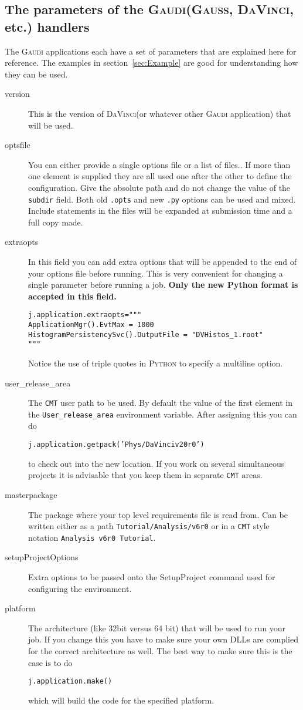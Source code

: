 \documentclass{howto}
\def\python {\textsc{Python}\xspace}
\def\gaudi {\textsc{Gaudi}\xspace}
\def\davinci {\textsc{DaVinci}\xspace}
\def\gauss {\textsc{Gauss}\xspace}
\def\davinciv {v20r0\xspace}
\begin{document}
\subsection{The parameters of the \gaudi (\gauss, \davinci, etc.) handlers}
\label{sec:GaudiParameters}
The \gaudi applications each have a set of parameters that are explained here
for reference. The examples in section~\ref{sec:Example} are good for
understanding how they can be used.
\begin{description}
\item[version] This is the version of \davinci (or whatever other \gaudi
  application) that will be used.
\item[optsfile] You can either provide a single options file or a list of
  files.. If more than one element is supplied they are all used one after the
  other to define the configuration. Give the absolute path and do not change
  the value of the \texttt{subdir} field. Both old \texttt{.opts} and new
  \texttt{.py} options can be used and mixed. Include statements in the files
  will be expanded at submission time and a full copy made.
\item[extraopts] In this field you can add extra options that will be appended
  to the end of your options file before running. This is very convenient for
  changing a single parameter before running a job. \textbf{Only the new
    Python format is accepted in this field.}
\begin{verbatim}
j.application.extraopts="""
ApplicationMgr().EvtMax = 1000
HistogramPersistencySvc().OutputFile = "DVHistos_1.root"
"""
\end{verbatim}
  Notice the use of triple quotes in \python to specify a multiline option.
\item[user_release_area] The \texttt{CMT} user path to be used. By default the
  value of the first element in the \texttt{User_release_area} environment
  variable. After assigning this you can do
\begin{alltt}
j.application.getpack('Phys/DaVinci \davinciv') 
\end{alltt}
  to check out into the new location. If you work on several simultaneous
  projects it is advisable that you keep them in separate \texttt{CMT} areas.
\item[masterpackage] The package where your top level requirements file is
  read from. Can be written either as a path \texttt{Tutorial/Analysis/v6r0}
  or in a \texttt{CMT} style notation \texttt{Analysis v6r0 Tutorial}.
\item[setupProjectOptions] Extra options to be passed onto the SetupProject command used for configuring the environment.
\item[platform] The architecture (like 32bit versus 64 bit) that will be used
  to run your job. If you change this you have to make sure your own DLLs are
  complied for the correct architecture as well. The best way to make sure
  this is the case is to do
\begin{verbatim}
j.application.make()
\end{verbatim}
  which will build the code for the specified platform.
\end{description}
\end{document}
